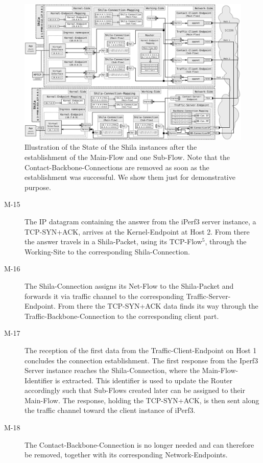 	\begin{landscape}
		\begin{figure}
			\begin{center}
				\def\svgwidth{1\textwidth}
				\includegraphics[scale=0.2]{../illustrations/implementation/ConnectionEstablishment.pdf}   
				\caption[Caption for the list of figures.]{Illustration of the State of the Shila instances after the establishment of the Main-Flow and one Sub-Flow. Note that the Contact-Backbone-Connections are removed as soon as the establishment was successful. We show them just for demonstrative purpose.}
				\label{fig:ConnectionEstablishment}
			\end{center}
		\end{figure}
	\end{landscape}
\begin{description}		
	\item[M-15] The IP datagram containing the answer from the iPerf3 server instance, a TCP-SYN+ACK, arrives at the Kernel-Endpoint at Host 2. From there the answer travels in a Shila-Packet, using its TCP-Flow$^{5}$, through the Working-Site to the corresponding Shila-Connection.
	\item[M-16] The Shila-Connection assigns its Net-Flow to the Shila-Packet and forwards it via traffic channel to the corresponding Traffic-Server-Endpoint. From there the TCP-SYN+ACK data finds its way through the Traffic-Backbone-Connection to the corresponding client part. 
	\item[M-17] The reception of the first data from the Traffic-Client-Endpoint on Host 1 concludes the connection establishment. The first response from the Iperf3 Server instance reaches the Shila-Connection, where the Main-Flow-Identifier is extracted. This identifier is used to update the Router accordingly such that Sub-Flows created later can be assigned to their Main-Flow. The response, holding the TCP-SYN+ACK, is then sent along the traffic channel toward the client instance of iPerf3.
	\item[M-18] The Contact-Backbone-Connection is no longer needed and can therefore be removed, together with its corresponding Network-Endpoints.
\end{description}

